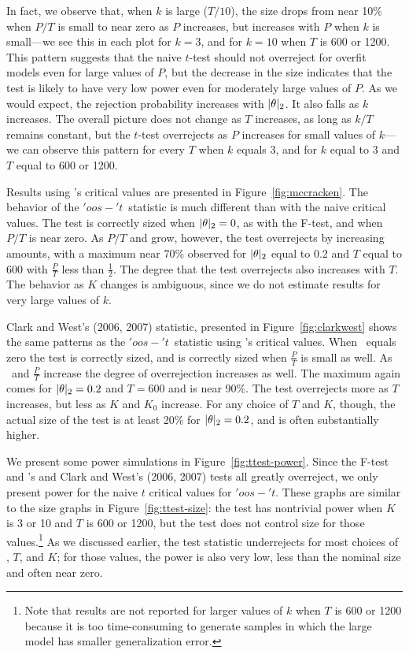 \documentclass[11pt]{article}
\newcommand{\citepos}[1]{\citeauthor{#1}'s \citeyearpar{#1}}
\newcommand{\oost}{\ensuremath{'oos-'t}}
\begin{document}
In fact, we observe that, when $k$ is large ($T/10$), the size drops
from near 10\% when $P/T$ is small to near zero as $P$ increases, but
increases with $P$ when $k$ is small---we see this in each plot for
$k=3$, and for $k=10$ when $T$ is 600 or 1200.  This pattern suggests
that the naive $t$-test should not overreject for overfit models even
for large values of $P$, but the decrease in the size indicates that
the test is likely to have very low power even for moderately large
values of $P$.  As we would expect, the rejection probability
increases with $\lvert \theta \rvert_2$.  It also falls as $k$ increases.  The
overall picture does not change as $T$ increases, as long as $k/T$
remains constant, but the $t$-test overrejects as $P$ increases for
small values of $k$---we can observe this pattern for every $T$ when
$k$ equals 3, and for $k$ equal to 3 and $T$ equal to 600 or 1200.

Results using \citepos{mccracken_asymptotics_2007} critical values are
presented in Figure~\ref{fig:mccracken}.  The behavior of the \oost\
statistic is much different than with the naive critical values.  The
test is correctly sized when $\lvert \theta \rvert_2 = 0$, as with the F-test, and
when $P/T$ is near zero.  As $P/T$ and \thetanorm grow, however, the
test overrejects by increasing amounts, with a maximum near 70\%
observed for $\lvert \theta \rvert_2$ equal to 0.2 and $T$ equal to 600 with
$\frac{P}{T}$ less than $\frac{1}{2}$.  The degree that the test
overrejects also increases with $T$.  The behavior as $K$ changes is
ambiguous, since we do not estimate results for very large values of
$k$.

Clark and West's (2006, 2007) statistic, presented
in Figure~\ref{fig:clarkwest} shows the same patterns as the \oost\
statistic using \citepos{mccracken_asymptotics_2007} critical values.
When \thetanorm\ equals zero the test is correctly sized, and is
correctly sized when $\frac{P}{T}$ is small as well.  As \thetanorm\
and $\frac{P}{T}$ increase the degree of overrejection increases as
well.  The maximum again comes for $\lvert \theta \rvert_2 = 0.2$ and $T = 600$
and is near 90\%.    The test overrejects more as $T$ increases, but
less as $K$ and $K_0$ increase.  For any choice of $T$ and $K$,
though, the actual size of the test is at least 20\% for $\lvert \theta \rvert_2 =
0.2$, and is often substantially higher.

We present some power simulations in Figure~\ref{fig:ttest-power}.
Since the F-test and \citepos{mccracken_asymptotics_2007} and Clark
and West's (2006, 2007) tests all greatly overreject, we only present
power for the naive $t$ critical values for \oost.  These graphs are
similar to the size graphs in Figure~\ref{fig:ttest-size}: the test
has nontrivial power when $K$ is 3 or 10 and $T$ is 600 or 1200, but
the test does not control size for those values.\footnote{Note that
  results are not reported for larger values of $k$ when $T$ is 600 or
  1200 because it is too time-consuming to generate samples in which
  the large model has smaller generalization error.}  As we discussed
earlier, the test statistic underrejects for most choices of
\thetanorm, $T$, and $K$; for those values, the power is also very
low, less than the nominal size and often near zero.
\end{document}
